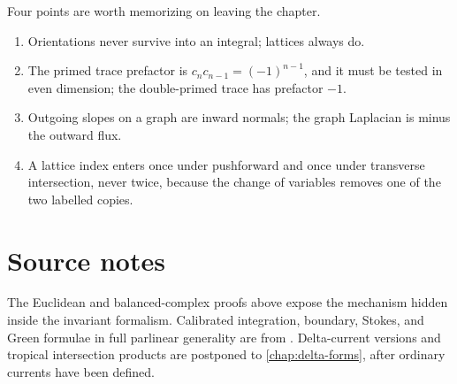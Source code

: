 Four points are worth memorizing on leaving the chapter.
\begin{enumerate}
\item Orientations never survive into an integral; lattices always do.
\item The primed trace prefactor is $c_nc_{n-1}=(-1)^{n-1}$,
  and it must be tested in even dimension; the double-primed trace
  has prefactor $-1$.
\item Outgoing slopes on a graph are inward normals; the graph Laplacian is
  minus the outward flux.
\item A lattice index enters once under pushforward and once under
  transverse intersection, never twice, because the change of variables
  removes one of the two labelled copies.
\end{enumerate}

\section*{Source notes}

The Euclidean and balanced-complex proofs above expose the mechanism hidden
inside the invariant formalism. Calibrated integration, boundary, Stokes, and
Green formulae in full parlinear generality are from
\cite[\S5]{CLD25}. Delta-current versions and tropical intersection products
are postponed to \cref{chap:delta-forms}, after ordinary currents have been defined.

